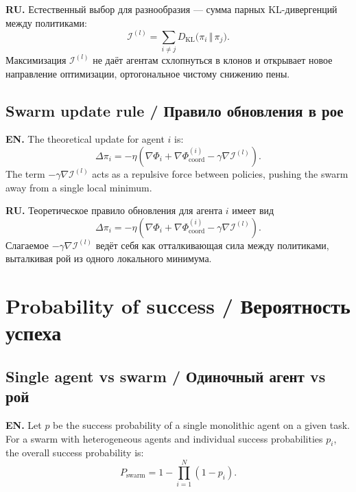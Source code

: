 \documentclass[11pt,a4paper]{article}
\begin{document}
\textbf{RU.}
Естественный выбор для разнообразия --- сумма парных KL-дивергенций между политиками:
\begin{equation}
\mathcal{I}^{(l)} = \sum_{i \neq j} D_{\text{KL}}\bigl(\pi_i \,\Vert\, \pi_j\bigr).
\end{equation}
Максимизация $\mathcal{I}^{(l)}$ не даёт агентам схлопнуться в клонов и открывает новое направление оптимизации, ортогональное чистому снижению пены.

\subsection{Swarm update rule / Правило обновления в рое}

\textbf{EN.}
The theoretical update for agent $i$ is:
\begin{equation}
\Delta \pi_i = -\eta \left( \nabla \Phi_i + \nabla \Phi^{(i)}_{\text{coord}} - \gamma \nabla \mathcal{I}^{(l)} \right).
\label{eq:swarm_update}
\end{equation}
The term $-\gamma \nabla \mathcal{I}^{(l)}$ acts as a repulsive force between policies, pushing the swarm away from a single local minimum.

\textbf{RU.}
Теоретическое правило обновления для агента $i$ имеет вид
\begin{equation}
\Delta \pi_i = -\eta \left( \nabla \Phi_i + \nabla \Phi^{(i)}_{\text{coord}} - \gamma \nabla \mathcal{I}^{(l)} \right).
\end{equation}
Слагаемое $-\gamma \nabla \mathcal{I}^{(l)}$ ведёт себя как отталкивающая сила между политиками, выталкивая рой из одного локального минимума.

\section{Probability of success / Вероятность успеха}

\subsection{Single agent vs swarm / Одиночный агент vs рой}

\textbf{EN.}
Let $p$ be the success probability of a single monolithic agent on a given task.
For a swarm with heterogeneous agents and individual success probabilities $p_i$, the overall success probability is:
\begin{equation}
P_{\text{swarm}} = 1 - \prod_{i=1}^{N} (1 - p_i).
\label{eq:Pswarm}
\end{equation}
\end{document}
